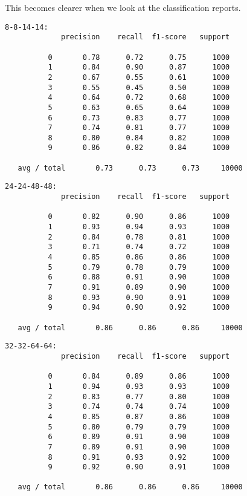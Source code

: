 This becomes clearer when we look at the classification reports.
\begin{verbatim}
8-8-14-14:
             precision    recall  f1-score   support
             
          0       0.78      0.72      0.75      1000
          1       0.84      0.90      0.87      1000
          2       0.67      0.55      0.61      1000
          3       0.55      0.45      0.50      1000
          4       0.64      0.72      0.68      1000
          5       0.63      0.65      0.64      1000
          6       0.73      0.83      0.77      1000
          7       0.74      0.81      0.77      1000
          8       0.80      0.84      0.82      1000
          9       0.86      0.82      0.84      1000
             
   avg / total       0.73      0.73      0.73     10000
\end{verbatim}
\begin{verbatim}  
24-24-48-48:
             precision    recall  f1-score   support
             
          0       0.82      0.90      0.86      1000
          1       0.93      0.94      0.93      1000
          2       0.84      0.78      0.81      1000
          3       0.71      0.74      0.72      1000
          4       0.85      0.86      0.86      1000
          5       0.79      0.78      0.79      1000
          6       0.88      0.91      0.90      1000
          7       0.91      0.89      0.90      1000
          8       0.93      0.90      0.91      1000
          9       0.94      0.90      0.92      1000
             
   avg / total       0.86      0.86      0.86     10000
\end{verbatim}
\begin{verbatim}    
32-32-64-64:
             precision    recall  f1-score   support
             
          0       0.84      0.89      0.86      1000
          1       0.94      0.93      0.93      1000
          2       0.83      0.77      0.80      1000
          3       0.74      0.74      0.74      1000
          4       0.85      0.87      0.86      1000
          5       0.80      0.79      0.79      1000
          6       0.89      0.91      0.90      1000
          7       0.89      0.91      0.90      1000
          8       0.91      0.93      0.92      1000
          9       0.92      0.90      0.91      1000
             
   avg / total       0.86      0.86      0.86     10000
\end{verbatim}
